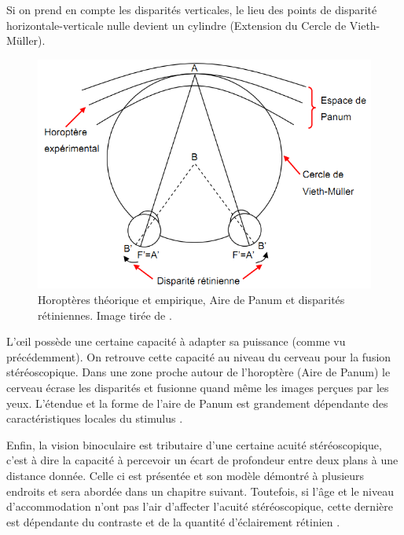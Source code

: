 	\par Si on prend en compte les disparités verticales, le lieu des points de disparité horizontale-verticale nulle devient un cylindre (Extension du Cercle de Vieth-Müller).
	
	\begin{figure}
		\centering
		\includegraphics[scale=.55]{Figures/HoropterePanum}
		\caption{Horoptères théorique et empirique, Aire de Panum et disparités rétiniennes. Image tirée de \citep{neveu_impact_2012}.}
		\label{fig:horoptere_panum}
	\end{figure}
	
	\par L'œil possède une certaine capacité à adapter sa puissance (comme vu précédemment). On retrouve cette capacité au niveau du cerveau pour la fusion stéréoscopique. Dans une zone proche autour de l'horoptère (Aire de Panum) le cerveau écrase les disparités et fusionne quand même les images perçues par les yeux. L'étendue et la forme de l'aire de Panum est grandement dépendante des caractéristiques locales du stimulus \citep{devisme_optimisation_2004}.
	
	\par Enfin, la vision binoculaire est tributaire d'une certaine acuité stéréoscopique, c'est à dire la capacité à percevoir un écart de profondeur entre deux plans à une distance donnée. Celle ci est présentée et son modèle démontré à plusieurs endroits \citep{fuchs_traite_2003, gross_human_2008} et sera abordée dans un chapitre suivant. Toutefois, si l'âge et le niveau d'accommodation n'ont pas l'air d'affecter l'acuité stéréoscopique, cette dernière est dépendante du contraste et de la quantité d'éclairement rétinien \citep{devisme_optimisation_2004}.
	
